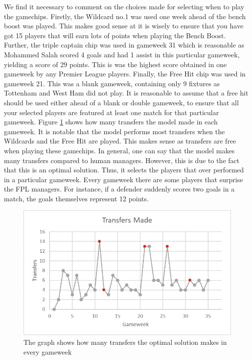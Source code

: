 We find it necessary to comment on the choices made for selecting when to play the gamechips. Firstly, the Wildcard no.1 was used one week ahead of the bench boost was played. This makes good sense at it is wisely to ensure that you have got 15 players that will earn lots of points when playing the Bench Boost. Further, the triple captain chip was used in gameweek 31 which is reasonable as Mohammed Salah scored 4 goals and had 1 assist in this particular gameweek, yielding a score of 29 points. This is was the highest score obtained in one gameweek by any Premier League players. Finally, the Free Hit chip was used in gameweek 21. This was a blank gameweek, containing only 9 fixtures as Tottenham and West Ham did not play. It is reasonable to assume that a free hit should be used either ahead of a blank or double gameweek, to ensure that all your selected players are featured at least one match for that particular gameweek.
\newpar
Figure \ref{Figure_Transfers} shows how many transfers the model made in each gameweek. It is notable that the model performs most transfers when the Wildcards and the Free Hit are played. This makes sense as transfers are free when playing these gamechips. In general, one can say that the model makes many transfers compared to human managers. However, this is due to the fact that this is an optimal solution. Thus, it selects the players that over performed in a particular gameweek. Every gameweek there are some players that surprise the FPL managers. For instance, if a defender suddenly scores two goals in a match, the goals themselves represent 12 points. 

\begin{figure}[H]
\label{fig_Transfers}
    \centering
    \includegraphics[scale=0.75]{fig/chapter_7/Transfers.png}
    \caption{The graph shows how many transfers the optimal solution makes in every gameweek}
\label{Figure_Transfers}    
\end{figure}


